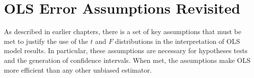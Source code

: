 \documentclass[11pt,openany]{book}
\begin{document}
\section{OLS Error Assumptions Revisited} 

As described in earlier chapters, there is a set of key assumptions that must be met to justify the use of the $t$ and $F$ distributions in the interpretation of OLS model results. In particular, these assumptions are necessary for hypotheses tests and the generation of confidence intervals. When met, the assumptions make OLS more efficient than any other unbiased estimator. 

\begin{grbox}
\end{grbox}
  
\end{document}
